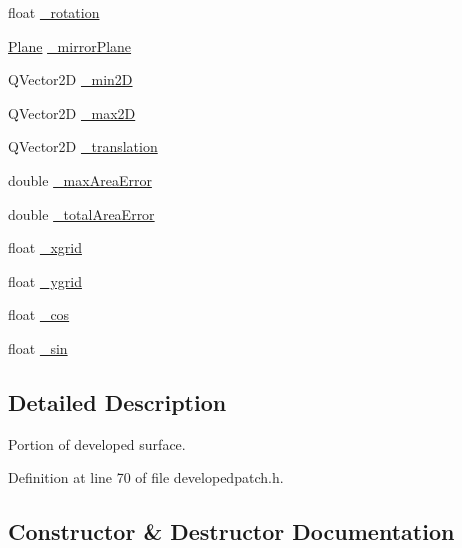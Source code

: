\begin{DoxyCompactItemize}
\item 
float \hyperlink{classShipCAD_1_1DevelopedPatch_a811b2655727eb8af2e15e9eb48b54e89}{\+\_\+rotation}
\item 
\hyperlink{classShipCAD_1_1Plane}{Plane} \hyperlink{classShipCAD_1_1DevelopedPatch_a88ff1deb88a87de3e54de5169edb542a}{\+\_\+mirror\+Plane}
\item 
Q\+Vector2D \hyperlink{classShipCAD_1_1DevelopedPatch_a7fe7981020e5078148b87c9b0bab9075}{\+\_\+min2D}
\item 
Q\+Vector2D \hyperlink{classShipCAD_1_1DevelopedPatch_a2d4528866ab65f5e92a808c21134003e}{\+\_\+max2D}
\item 
Q\+Vector2D \hyperlink{classShipCAD_1_1DevelopedPatch_a58a7a720496ce4fe60118e4e6e477fdd}{\+\_\+translation}
\item 
double \hyperlink{classShipCAD_1_1DevelopedPatch_af180b25af9b064398ad1c08747589d78}{\+\_\+max\+Area\+Error}
\item 
double \hyperlink{classShipCAD_1_1DevelopedPatch_ace1b56968ee580af5a6776bdc5d67d59}{\+\_\+total\+Area\+Error}
\item 
float \hyperlink{classShipCAD_1_1DevelopedPatch_a573e309a7022ad3b2eef7441b1f9f663}{\+\_\+xgrid}
\item 
float \hyperlink{classShipCAD_1_1DevelopedPatch_a501d803bd3252e9949a521cdd6ccff7b}{\+\_\+ygrid}
\item 
float \hyperlink{classShipCAD_1_1DevelopedPatch_a3b00c2638e7bf0d281914bb61d7d9717}{\+\_\+cos}
\item 
float \hyperlink{classShipCAD_1_1DevelopedPatch_aad8361f99a45d4fa04450828e0e177d0}{\+\_\+sin}
\end{DoxyCompactItemize}


\subsection{Detailed Description}
Portion of developed surface. 

Definition at line 70 of file developedpatch.\+h.



\subsection{Constructor \& Destructor Documentation}
